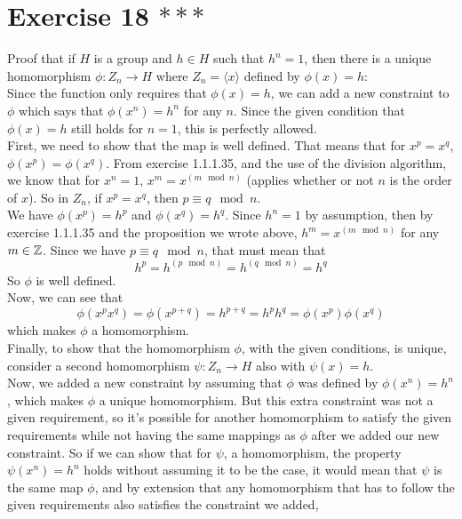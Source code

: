 \documentclass[12pt]{article}
\begin{document}
    \section*{Exercise 18 $***$}
    Proof that if $H$ is a group and $h \in H$
    such that $h^n = 1$,
    then there is a unique homomorphism $\phi: Z_n \to H$
    where $Z_n = \langle x \rangle$ defined by $\phi(x) = h$: \\
    Since the function only requires that $\phi(x) = h$,
    we can add a new constraint to $\phi$ which says that 
    $\phi(x^n) = h^n$ for any $n$.
    Since the given condition that $\phi(x) = h$ still holds for $n = 1$,
    this is perfectly allowed. \\
    First, we need to show that the map is well defined.
    That means that for $x^p = x^q$, $\phi(x^p) = \phi(x^q)$.
    From exercise 1.1.1.35, and the use of the division
    algorithm, we know that for $x^n = 1$, $x^m = x^{(m \mod n)}$
    (applies whether or not $n$ is the order of $x$).
    So in $Z_n$, if $x^p = x^q$, then $p \equiv q \mod n$. \\
    We have $\phi(x^p) = h^p$ and $\phi(x^q) = h^q$.
    Since $h^n = 1$ by assumption, then by exercise 1.1.1.35
    and the proposition we wrote above,
    $h^m = x^{(m \mod n)}$ for any $m \in \mathbb{Z}$.
    Since we have $p \equiv q \mod n$, that must mean
    that
    \[ h^p = h^{(p \mod n)} = h^{(q \mod n)} = h^{q} \]
    So $\phi$ is well defined. \\
    Now, we can see that
    \[ \phi(x^px^q) = \phi(x^{p + q})
    = h^{p + q}
    = h^ph^q
    = \phi(x^p)\phi(x^q)  \]
    which makes $\phi$ a homomorphism. \\
    Finally, to show that the homomorphism $\phi$, with the given conditions,
    is unique,
    consider a second homomorphism $\psi: Z_n \to H$
    also with $\psi(x) = h$. \\
    Now, we added a new constraint by assuming that $\phi$ was
    defined by $\phi(x^n) = h^n$,
    which makes $\phi$ a unique homomorphism.
    But this extra constraint was not a given requirement,
    so it's possible for another homomorphism to satisfy
    the given requirements while not having the same mappings as $\phi$
    after we added our new constraint.
    So if we can show that for $\psi$, a homomorphism,
    the property $\psi(x^n) = h^n$ holds without assuming it to be the case,
    it would mean that $\psi$ is the same map $\phi$,
    and by extension that any homomorphism that has to follow the given
    requirements also satisfies the constraint we added,
\end{document}
